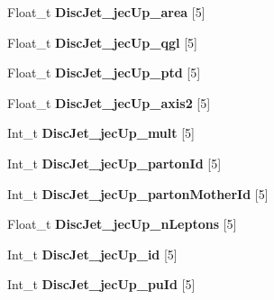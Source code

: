 \begin{DoxyCompactItemize}
\item 
\hypertarget{classMiniTree_ab5c38e51645fc73ed34703c47433ecbc}{}\label{classMiniTree_ab5c38e51645fc73ed34703c47433ecbc} 
Float\+\_\+t {\bfseries Disc\+Jet\+\_\+jec\+Up\+\_\+area} \mbox{[}5\mbox{]}
\item 
\hypertarget{classMiniTree_a1bcc84fb688bf578a000eede2a0d8876}{}\label{classMiniTree_a1bcc84fb688bf578a000eede2a0d8876} 
Float\+\_\+t {\bfseries Disc\+Jet\+\_\+jec\+Up\+\_\+qgl} \mbox{[}5\mbox{]}
\item 
\hypertarget{classMiniTree_a33243311456bb6a93ec25d38452dfdea}{}\label{classMiniTree_a33243311456bb6a93ec25d38452dfdea} 
Float\+\_\+t {\bfseries Disc\+Jet\+\_\+jec\+Up\+\_\+ptd} \mbox{[}5\mbox{]}
\item 
\hypertarget{classMiniTree_a9ee1a6089b10d0d3c4d8f87554fd9041}{}\label{classMiniTree_a9ee1a6089b10d0d3c4d8f87554fd9041} 
Float\+\_\+t {\bfseries Disc\+Jet\+\_\+jec\+Up\+\_\+axis2} \mbox{[}5\mbox{]}
\item 
\hypertarget{classMiniTree_a4319ac712129b866bce3cc93a3116344}{}\label{classMiniTree_a4319ac712129b866bce3cc93a3116344} 
Int\+\_\+t {\bfseries Disc\+Jet\+\_\+jec\+Up\+\_\+mult} \mbox{[}5\mbox{]}
\item 
\hypertarget{classMiniTree_a265ad5f51a16b1640a5bdcfb36f36d1c}{}\label{classMiniTree_a265ad5f51a16b1640a5bdcfb36f36d1c} 
Int\+\_\+t {\bfseries Disc\+Jet\+\_\+jec\+Up\+\_\+parton\+Id} \mbox{[}5\mbox{]}
\item 
\hypertarget{classMiniTree_a99abc7ef3124adf7ebd93d8037cde91d}{}\label{classMiniTree_a99abc7ef3124adf7ebd93d8037cde91d} 
Int\+\_\+t {\bfseries Disc\+Jet\+\_\+jec\+Up\+\_\+parton\+Mother\+Id} \mbox{[}5\mbox{]}
\item 
\hypertarget{classMiniTree_aa0408c076642f2c617fcb65f01cd3725}{}\label{classMiniTree_aa0408c076642f2c617fcb65f01cd3725} 
Float\+\_\+t {\bfseries Disc\+Jet\+\_\+jec\+Up\+\_\+n\+Leptons} \mbox{[}5\mbox{]}
\item 
\hypertarget{classMiniTree_a038fa5f387e57a2c610ac1327b2f8f10}{}\label{classMiniTree_a038fa5f387e57a2c610ac1327b2f8f10} 
Int\+\_\+t {\bfseries Disc\+Jet\+\_\+jec\+Up\+\_\+id} \mbox{[}5\mbox{]}
\item 
\hypertarget{classMiniTree_a7cde845ad3fd753df06779261c77d051}{}\label{classMiniTree_a7cde845ad3fd753df06779261c77d051} 
Int\+\_\+t {\bfseries Disc\+Jet\+\_\+jec\+Up\+\_\+pu\+Id} \mbox{[}5\mbox{]}
\item 
\hypertarget{classMiniTree_afe4ad1a33bc0066be4fda799df55c90d}{}\label{classMiniTree_afe4ad1a33bc0066be4fda799df55c90d} 

\end{DoxyCompactItemize}

